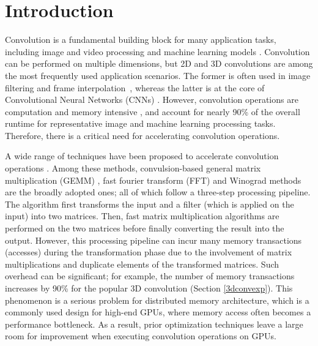 \section{Introduction}
Convolution is a fundamental building block for many application tasks, including image and video processing and machine learning
models \cite{Perrot2014Fine,Ma2014Optimized,Rudi2015Image,Niklaus2017Video,Krizhevsky2012ImageNet,SimonyanZ14a,HeZRS16,SzegedyLJSRAEVR15}. Convolution can be performed on multiple dimensions, but 2D and 3D convolutions are among the most frequently used
application scenarios. The former is often used in image filtering and frame
interpolation~\cite{Perrot2014Fine,Ma2014Optimized,Rudi2015Image,Niklaus2017Video}, whereas the latter is at the core of Convolutional
Neural Networks (CNNs) \cite{Krizhevsky2012ImageNet,SimonyanZ14a,HeZRS16,SzegedyLJSRAEVR15}. However, convolution operations are computation and memory intensive \cite{cavigelli2015accelerating},
and account for nearly 90\% of the overall runtime \cite{Li2016Performance} for representative image and machine learning processing tasks.
Therefore, there is a critical need for accelerating convolution operations.


A wide range of techniques have been proposed to accelerate convolution operations \cite{Iandola2014Communication,vasilache2014fast,lavin2016fast,cho2017mec,Zhen2018Optimizing,Vasudevan2017Parallel,Chellapilla2006High,zhang2015dwarfcode}. Among these methods, convulsion-based general matrix multiplication (GEMM) \cite{Vasudevan2017Parallel,Chellapilla2006High}, fast fourier transform (FFT) \cite{vasilache2014fast} and Winograd \cite{lavin2016fast} methods are the broadly adopted ones;  all of which follow a three-step processing pipeline. The algorithm first transforms the input and a filter (which is applied on the input) into two matrices. Then, fast matrix multiplication algorithms \cite{karstadt2017matrix,scott2015matrix} are performed on the two matrices before finally converting the result into the output.
However, this processing pipeline can incur many memory transactions (accesses) during the
transformation phase due to the involvement of matrix multiplications and duplicate elements of the transformed
matrices. Such overhead can be significant; for example, the number of memory transactions increases 
by 90\% for the popular 3D convolution (Section \ref{3dconvexp}). This phenomenon is a serious problem for distributed memory
architecture, which is a commonly used design for high-end GPUs, where memory access often becomes a performance bottleneck. As a
result, prior optimization techniques leave a large room for improvement when executing convolution operations on GPUs.


